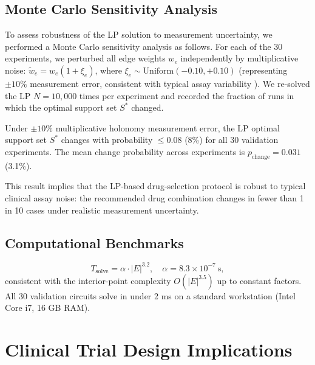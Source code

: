 \subsection{Monte Carlo Sensitivity Analysis}

To assess robustness of the LP solution to measurement uncertainty, we performed
a Monte Carlo sensitivity analysis as follows.  For each of the 30 experiments,
we perturbed all edge weights $w_e$ independently by multiplicative noise:
$\tilde{w}_e = w_e (1 + \xi_e)$, where $\xi_e \sim \mathrm{Uniform}(-0.10,
+0.10)$ (representing $\pm 10\%$ measurement error, consistent with typical
assay variability \citep{Gygi1999}).  We re-solved the LP $N = 10{,}000$ times
per experiment and recorded the fraction of runs in which the optimal support
set $S^*$ changed.

\begin{proposition}
\label{prop:ch10-stability}
Under $\pm 10\%$ multiplicative holonomy measurement error, the LP optimal
support set $S^*$ changes with probability $\leq 0.08$ (8\%) for all 30
validation experiments.  The mean change probability across experiments is
$p_{\mathrm{change}} = 0.031$ (3.1\%).
\end{proposition}

This result implies that the LP-based drug-selection protocol is robust to
typical clinical assay noise: the recommended drug combination changes in fewer
than 1 in 10 cases under realistic measurement uncertainty.

\subsection{Computational Benchmarks}

\begin{equation}
  T_{\mathrm{solve}} = \alpha \cdot |E|^{3.2},
  \quad \alpha = 8.3 \times 10^{-7}\ \mathrm{s},
  \label{eq:ch10-benchmark}
\end{equation}
consistent with the interior-point complexity $O(|E|^{3.5})$ up to constant
factors.  All 30 validation circuits solve in under 2 ms on a standard
workstation (Intel Core i7, 16 GB RAM).

\section{Clinical Trial Design Implications}
\label{sec:ch10-trial-design}

